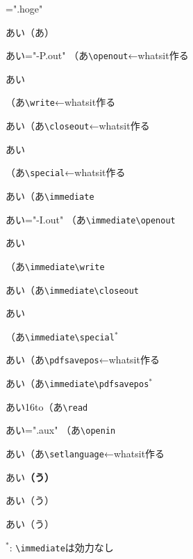 \documentclass{jsarticle}
\begin{document}
\def\cs#1{\texttt{\textbackslash #1}}
\immediate{}="\jobname.hoge"\immediate{}

あい\inhibitglue（あ）

あい\inhibitglue{}="\jobname-P.out"
（あ\cs{openout}←whatsit作る

あい\inhibitglue{}（あ\cs{write}←whatsit作る

あい\inhibitglue{}（あ\cs{closeout}←whatsit作る

あい\inhibitglue{}（あ\cs{special}←whatsit作る

あい\inhibitglue\immediate（あ\cs{immediate}

あい\inhibitglue\immediate{}="\jobname-I.out"
（あ\cs{immediate}\cs{openout}

あい\inhibitglue\immediate{}（あ\cs{immediate}\cs{write}

あい\inhibitglue\immediate{}（あ\cs{immediate}\cs{closeout}

あい\inhibitglue\immediate{}（あ\cs{immediate}\cs{special}$^*$

あい\inhibitglue\pdfsavepos（あ\cs{pdfsavepos}←whatsit作る

あい\inhibitglue\immediate\pdfsavepos（あ\cs{immediate}\cs{pdfsavepos}$^*$

あい\inhibitglue\read16to\CS （あ\cs{read}

あい\inhibitglue{}="\jobname.aux"
（あ\cs{openin}

あい\inhibitglue{}（あ\cs{setlanguage}←whatsit作る


あい\inhibitglue\textbf{（う）}

あい\inhibitglue\textsf{（う）}

あい\inhibitglue\textsf{（う）}

$^*$: \cs{immediate}は効力なし
\end{document}
